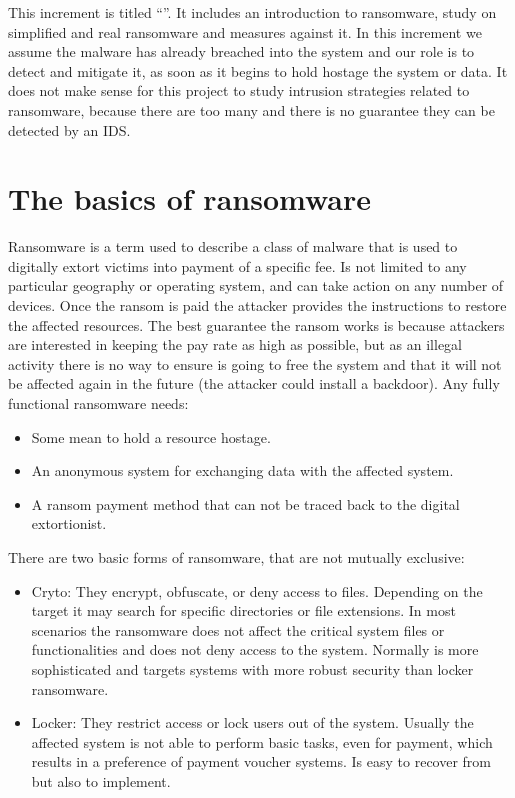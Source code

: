 This increment is titled ``\IncrementoTres''.
It includes an introduction to ransomware, study on simplified and real ransomware and measures against it.
\linej
\linej
In this increment we assume the malware has already breached into the system and our role is to detect and mitigate it, as soon as it begins to hold hostage the system or data.
It does not make sense for this project to study intrusion strategies related to ransomware, because there are too many and there is no guarantee they can be detected by an IDS.

\section{The basics of ransomware}
Ransomware is a term used to describe a class of malware that is used to digitally extort victims into payment of a specific fee.
Is not limited to any particular geography or operating system, and can take action on any number of devices\cite{ransomware_oReilly}.
\linej
Once the ransom is paid the attacker provides the instructions to restore the affected resources.
The best guarantee the ransom works is because attackers are interested in keeping the pay rate as high as possible, but as an illegal activity there is no way to ensure is going to free the system and that it will not be affected again in the future (the attacker could install a backdoor).
\linej
\linej
Any fully functional ransomware needs\cite{ransomware_digital_extortion}:
\begin{itemize}
\item Some mean to hold a resource hostage.
\item An anonymous system for exchanging data with the affected system.
\item A ransom payment method that can not be traced back to the digital extortionist.
\end{itemize}
\linej
There are two basic forms of ransomware, that are not mutually exclusive\cite{ransomware_oReilly}\cite{ransomware_digital_extortion}:
\begin{itemize}
\item Cryto: They encrypt, obfuscate, or deny access to files.
Depending on the target it may search for specific directories or file extensions.
In most scenarios the ransomware does not affect the critical system files or functionalities and does not deny access to the system.
Normally is more sophisticated and targets systems with more robust security than locker ransomware.
\item Locker: They restrict access or lock users out of the system.
Usually the affected system is not able to perform basic tasks, even for payment, which results in a preference of payment voucher systems.
Is easy to recover from but also to implement.
\end{itemize}
